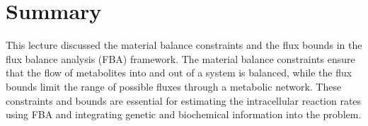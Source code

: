 \documentclass{article}[11pt]
\begin{document}
\section{Summary}
This lecture discussed the material balance constraints and the flux bounds in the flux balance analysis (FBA) framework.
The material balance constraints ensure that the flow of metabolites into and out of a system is balanced, while the flux bounds limit the range of possible fluxes through a metabolic network.
These constraints and bounds are essential for estimating the intracellular reaction rates using FBA and integrating genetic and biochemical information into the problem.


\end{document}
